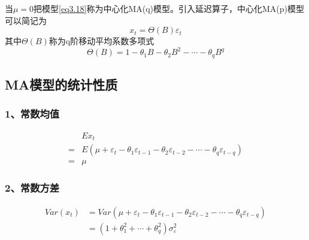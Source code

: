 \documentclass[12pt, a4paper, oneside]{ctexbook}
\begin{document}
当$\mu = 0$把模型\ref{eq3.18}称为中心化MA(q)模型。引入延迟算子，中心化MA(p)模型可以简记为
\begin{equation}
    x_t=\Theta(B)\varepsilon_t
\end{equation}
其中$\Theta(B)$称为q阶移动平均系数多项式
\begin{equation*}
    \Theta(B)=1-\theta_1B-\theta_2B^2-\cdots-\theta_qB^q
\end{equation*}

\subsection{MA模型的统计性质}
\subsubsection{1、常数均值}
\begin{equation}
    \begin{aligned}
          & E{x}_{t}                                                                                                  \\
        = & E(\mu+\varepsilon_t-\theta_1\varepsilon_{t-1}-\theta_2\varepsilon_{t-2}-\cdots-\theta_q\varepsilon_{t-q}) \\
        = & \mu
    \end{aligned}
\end{equation}

\subsubsection{2、常数方差}
\begin{equation}
    \begin{aligned}
        Var(x_{t}) & =Var(\mu+\varepsilon_t-\theta_1\varepsilon_{t-1}-\theta_2\varepsilon_{t-2}-\cdots-\theta_q\varepsilon_{t-q}) \\
                   & =(1+\theta_1^2+\cdots+\theta_q^2)\sigma_\varepsilon^2
    \end{aligned}
\end{equation}
\end{document}

